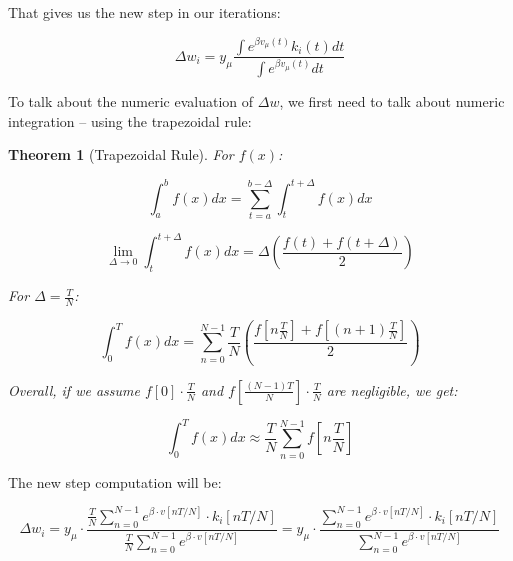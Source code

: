 That gives us the new step in our iterations:

\begin{equation}
\Delta w_i = y_{\mu}\frac{\int e^{\beta v_{\mu}(t)} k_i(t) dt}{\int e^{\beta v_{\mu}(t)} dt}
\end{equation}

To talk about the numeric evaluation of $\Delta w$, we first need to talk about numeric integration – using the trapezoidal rule:

\newtheorem{theorem}{Theorem}

\begin{mdframed}[linewidth=2pt, frametitlerule=true, frametitlebackgroundcolor=gray!20, innertopmargin=10pt, innerbottommargin=10pt]
    \begin{theorem}[Trapezoidal Rule]
        For $f(x)$:
        
        \begin{equation*}
            \int_a^b f(x) dx = \sum_{t=a}^{b-\Delta} \int_t^{t+\Delta} f(x) dx
        \end{equation*}

        \begin{equation*}
            \lim_{{\Delta\to0}} \int_t^{t+\Delta} f(x) dx = \Delta \left(\frac{f(t)+f(t+\Delta)}{2}\right)
        \end{equation*}

        For $\Delta = \frac{T}{N}$:

        \begin{equation*}
            \int_0^T f(x) dx = \sum_{n=0}^{N-1} \frac{T}{N}\left(\frac{f[n\frac{T}{N}]+f[(n+1)\frac{T}{N}]}{2}\right)
        \end{equation*}

        Overall, if we assume $f[0] \cdot \frac{T}{N}$ and $f\left[\frac{(N-1)T}{N}\right] \cdot \frac{T}{N}$ are negligible, we get:

        \begin{equation*}
            \int_0^T f(x) dx \approx \frac{T}{N}\sum_{n=0}^{N-1} f[n\frac{T}{N}]
        \end{equation*}
    \end{theorem}
\end{mdframed}

The new step computation will be:

\begin{equation}
    \Delta w_i = y_{\mu} \cdot \frac{\frac{T}{N}\sum_{n=0}^{N-1} e^{\beta \cdot v[nT/N]} \cdot k_i[nT/N]}{\frac{T}{N}\sum_{n=0}^{N-1} e^{\beta \cdot v[nT/N]}} = y_{\mu} \cdot \frac{\sum_{n=0}^{N-1} e^{\beta \cdot v[nT/N]} \cdot k_i[nT/N]}{\sum_{n=0}^{N-1} e^{\beta \cdot v[nT/N]}}
\end{equation}

